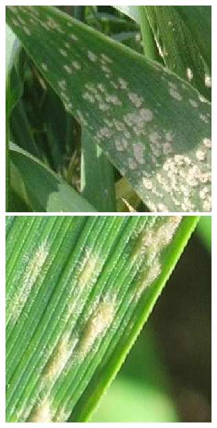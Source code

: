 \begin{figure}[htbp]
{\begin{minipage}[t]{.2\textwidth}
          \includegraphics[width=\textwidth, natwidth=300, natheight=300]{resource/3.3白粉病(2).jpg} \
          \includegraphics[width=\textwidth, natwidth=300, natheight=300]{resource/3.3白粉病(3).jpg} \

\end{minipage}}
\end{figure}
